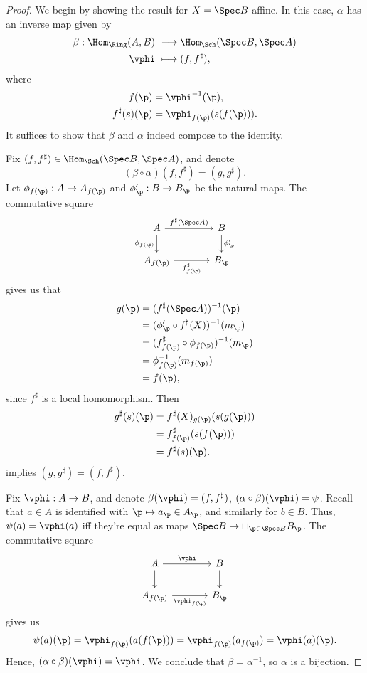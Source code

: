 \documentclass[12pt]{amsart}
\begin{document}
\begin{proof}
  We begin by showing the result for $X=\Spec B$ affine.
  In this case, $\alpha$ has an inverse map given by 
  \begin{align*}
    \beta:\Hom_{\Ring}(A,B)&~\longrightarrow \Hom_{\Sch}(\Spec B,\Spec A) \\
    \vphi&~\longmapsto (f,f^\sharp),
  \end{align*}
  where 
  \begin{align*}
    f(\p)&=\vphi^{-1}(\p), \\
    f^\sharp(s)(\p)&=\vphi_{f(\p)}(s(f(\p))).
  \end{align*}
  It suffices to show that $\beta$ and $\alpha$ indeed compose to the identity.

  Fix $(f,f^\sharp)\in \Hom_{\Sch}(\Spec B,\Spec A)$, and denote 
  \[
    (\beta\circ\alpha)(f,f^\sharp) = (g,g^\sharp).
  \]
  Let $\phi_{f(\p)}:A\to A_{f(\p)}$ and $\phi_\p':B\to B_\p$ be the natural maps.
  The commutative square
  \[
    \begin{tikzcd}[column sep = large]
      A\ar[d,"\phi_{f(\p)}"']
      \ar[r,"f^\sharp(\Spec A)"]&B\ar[d,"\phi'_\p"] \\
      A_{f(\p)}\ar[r,"f^\sharp_{f(\p)}"']&B_\p
    \end{tikzcd}
  \] 
  gives us that 
  \begin{align*}
    g(\p)&=(f^\sharp(\Spec A))^{-1}(\p) \\
         &=(\phi'_\p\circ f^\sharp(X))^{-1}(m_\p) \\
         &=(f_{f(\p)}^\sharp\circ \phi_{f(\p)})^{-1}(m_\p) \\
         &= {\phi}_{f(\p)}^{-1}(m_{f(\p)}) \\
         &= f(\p),
  \end{align*}
  since $f^\sharp$ is a local homomorphism.
  Then
  \begin{align*}
    g^\sharp(s)(\p) &= f^\sharp(X)_{g(\p)}(s(g(\p))) \\
                    &= f^\sharp_{f(\p)}(s(f(\p))) \\ 
                    &=f^\sharp(s)(\p).
  \end{align*}
  implies $(g,g^\sharp)=(f,f^\sharp)$.

  Fix $\vphi:A\to B$, and denote $\beta(\vphi)=(f,f^\sharp)$, $(\alpha\circ \beta)(\vphi)= \psi$.
  Recall that $a\in A$ is identified with $\p\mapsto a_\p\in A_\p$, and similarly for $b\in B$.
  Thus, $\psi(a)=\vphi(a)$ iff they're equal as maps $\Spec B\to \sqcup_{\p\in \Spec B}B_\p$.
  The commutative square
  \[
    \begin{tikzcd}[column sep = large]
      A\ar[d]
      \ar[r,"\vphi"]&B\ar[d] \\
      A_{f(\p)}\ar[r,"\vphi_{f(\p)}"']&B_\p
    \end{tikzcd}
  \] 
  gives us
  \[
    \psi(a)(\p) = \vphi_{f(\p)}(a(f(\p))) = \vphi_{f(\p)}(a_{f(\p)}) = \vphi(a)(\p).
  \]
  Hence, $(\alpha\circ\beta)(\vphi)=\vphi$.
  We conclude that $\beta=\alpha^{-1}$, so $\alpha$ is a bijection.


\end{proof}
\end{document}
